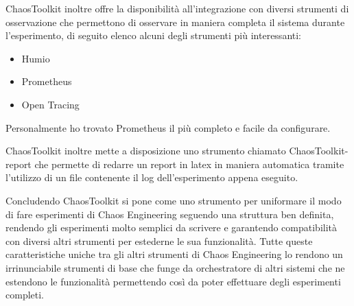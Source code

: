 ChaosToolkit inoltre offre la disponibilità all'integrazione con diversi strumenti di osservazione che permettono di osservare in maniera completa il sistema durante l'esperimento, di seguito elenco alcuni degli strumenti più interessanti:
\begin{itemize}
    \item Humio
    \item Prometheus
    \item Open Tracing
\end{itemize}
Personalmente ho trovato Prometheus il più completo e facile da configurare.

ChaosToolkit inoltre mette a disposizione uno strumento chiamato ChaosToolkit-report che permette di redarre un report in latex in maniera automatica tramite l'utilizzo di un file contenente il log dell'esperimento appena eseguito.

Concludendo ChaosToolkit si pone come uno strumento per uniformare il modo di fare esperimenti di Chaos Engineering seguendo una struttura ben definita, rendendo gli esperimenti molto semplici da scrivere e garantendo compatibilità con diversi altri strumenti per estederne le sua funzionalità.
Tutte queste caratteristiche uniche tra gli altri strumenti di Chaos Engineering lo rendono un irrinunciabile strumenti di base che funge da orchestratore di altri sistemi che ne estendono le funzionalità permettendo così da poter effettuare degli esperimenti completi.
